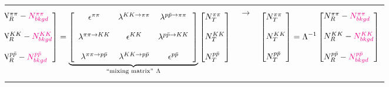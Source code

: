 \begin{tabulary}{\textwidth}{LCL}
\begin{equation}\label{eq:misidentificationMatrix}\hspace*{-15pt}
\Spvek{N^{\pi\pi}_{R}-\textcolor{magenta}{N^{\pi\pi}_{bkgd}};~;N^{KK}_{R}-\textcolor{magenta}{N^{KK}_{bkgd}};~;N^{p\bar{p}}_{R}-\textcolor{magenta}{N^{p\bar{p}}_{bkgd}}} =  \underbrace{\left[ \begin{array}{ccc}
\epsilon^{\pi\pi} & \lambda^{ KK\rightarrow \pi\pi} & \lambda^{p\bar{p} \rightarrow \pi\pi} \\
~ & ~ & ~\\
\lambda^{\pi\pi\rightarrow KK} & \epsilon^{KK} & \lambda^{ p\bar{p} \rightarrow KK}\\
~ & ~ & ~\\
\lambda^{\pi\pi\rightarrow p\bar{p}} & \lambda^{ KK\rightarrow p\bar{p}} & \epsilon^{p\bar{p}}
\end{array} \right]}_{\text{``mixing matrix''}~\Lambda}\Spvek{N^{\pi\pi}_{T};~;N^{KK}_{T};~;N^{p\bar{p}}_{T}}
\end{equation}&%
\vspace{40pt}$\rightarrow$\hspace{20pt}&
\begin{equation}\label{eq:pidUnfoldingMatrix}
\Spvek{N^{\pi\pi}_{T};~;N^{KK}_{T};~;N^{p\bar{p}}_{T}} = \Lambda^{-1}\Spvek{N^{\pi\pi}_{R}-\textcolor{magenta}{N^{\pi\pi}_{bkgd}};~;N^{KK}_{R}-\textcolor{magenta}{N^{KK}_{bkgd}};~;N^{p\bar{p}}_{R}-\textcolor{magenta}{N^{p\bar{p}}_{bkgd}}}
\end{equation}
\end{tabulary}



